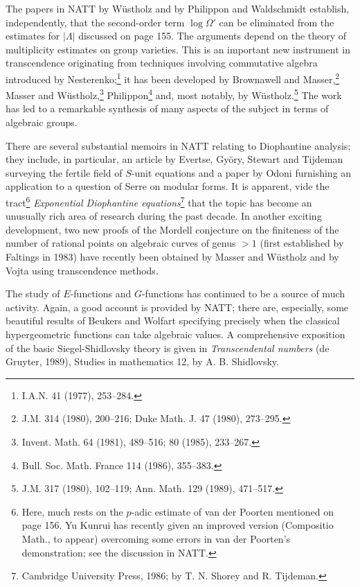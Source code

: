 The papers in NATT by W{\"u}stholz and by Philippon and Waldschmidt establish, independently, that the second-order term \(\log \Omega'\) can be eliminated from the estimates for \(|\Lambda|\) discussed on page 155. The arguments depend on the theory of multiplicity estimates on group varieties. This is an important new instrument in transcendence originating from techniques involving commutative algebra introduced by Nesterenko;\footnote{I.A.N. 41 (1977), 253--284.} it has been developed by Brownawell and Masser,\footnote{J.M. 314 (1980), 200--216; Duke Math. J. 47 (1980), 273--295.} Masser and W{\"u}stholz,\footnote{Invent. Math. 64 (1981), 489--516; 80 (1985), 233--267.} Philippon\footnote{Bull. Soc. Math. France 114 (1986), 355--383.} and, most notably, by W{\"u}stholz.\footnote{J.M. 317 (1980), 102--119; Ann. Math. 129 (1989), 471--517.} The work has led to a remarkable synthesis of many aspects of the subject in terms of algebraic groups.

There are several substantial memoirs in NATT relating to Diophantine analysis; they include, in particular, an article by Evertse, Gy{\"o}ry, Stewart and Tijdeman surveying the fertile field of \(S\)-unit equations and a paper by Odoni furnishing an application to a question of Serre on modular forms. It is apparent, vide the tract\footnote{Here, much rests on the \(p\)-adic estimate of van der Poorten mentioned on page 156. Yu Kunrui has recently given an improved version (Compositio Math., to appear) overcoming some errors in van der Poorten's demonstration; see the discussion in NATT.} \textit{Exponential Diophantine equations}\footnote{Cambridge University Press, 1986; by T. N. Shorey and R. Tijdeman.} that the topic has become an unusually rich area of research during the past decade. In another exciting development, two new proofs of the Mordell conjecture on the finiteness of the number of rational points on algebraic curves of genus \({}>1\) (first established by Faltings in 1983) have recently been obtained by Masser and W{\"u}stholz and by Vojta using transcendence methods.

The study of \(E\)-functions and \(G\)-functions has continued to be a source of much activity. Again, a good account is provided by NATT; there are, especially, some beautiful results of Beukers and Wolfart specifying precisely when the classical hypergeometric functions can take algebraic values. A comprehensive exposition of the basic Siegel-Shidlovsky theory is given in \textit{Transcendental numbers} (de Gruyter, 1989), Studies in mathematics 12, by A. B. Shidlovsky.

